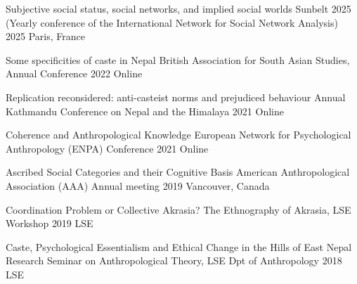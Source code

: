 

\begin{cvpresentations}



  \cvpresentation
    {Subjective social status, social networks, and implied social worlds} %
    {Sunbelt 2025 (Yearly conference of the International Network for Social Network Analysis)} %
    {2025} %
    {Paris, France} %


  \cvpresentation
    {Some specificities of caste in Nepal} %
    {British Association for South Asian Studies, Annual Conference} %
    {2022} %
    {Online} %

  \cvpresentation
    {Replication reconsidered: anti-casteist norms and prejudiced behaviour} %
    {Annual Kathmandu Conference on Nepal and the Himalaya} %
    {2021} %
    {Online} %

  \cvpresentation
    {Coherence and Anthropological Knowledge} %
    {European Network for Psychological Anthropology (ENPA) Conference} %
    {2021} %
    {Online} %

  \cvpresentation
    {Ascribed Social Categories and their Cognitive Basis} %
    {American Anthropological Association (AAA) Annual meeting} %
    {2019} %
    {Vancouver, Canada} %

  \cvpresentation
    {Coordination Problem or Collective Akrasia?} %
    {The Ethnography of Akrasia, LSE Workshop} %
    {2019} %
    {LSE} %

  \cvpresentation
    {Caste, Psychological Essentialism and Ethical Change in the Hills of East Nepal} %
    {Research Seminar on Anthropological Theory, LSE Dpt of Anthropology} %
    {2018} %
    {LSE} %

\end{cvpresentations}
